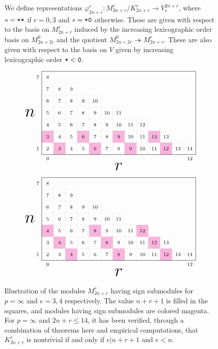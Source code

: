 \documentclass{amsart}
\begin{document}
\begin{figure}
\caption{We define representations $\varphi_{2n + r}^r:M_{2n + r}^r/K_{2n + r}^r \rightarrow V^{2n + r}_{s}$, where $s = \texttt{*}\texttt{*}$ if $r = 0,3$ and $s = \texttt{*}\texttt{0}$ otherwise.
These are given with respect to the basis on $M_{2n + r}^r$ induced by the increasing lexicographic order basis on $M_{2n + 2r}^0$ and the quotient $M_{2n + 2r}^0 \twoheadrightarrow M_{2n + r}^r$.
These are also given with respect to the basis on $V$ given by increasing lexicographic order $\texttt{*} < \texttt{0}$.
  }\label{Fib Data}
\end{figure}

\begin{figure}
  \[
    \ENRGrid{13/7}{2/1,5/1,8/1,11/1,1/2,4/2,7/2,10/2}
  \]\[
    \ENRGrid{13/7}{3/1,7/1,11/1,2/2,6/2,10/2,1/3,5/3,9/3}
  \]
  \caption{
    Illustration of the modules $M_{2n + r}^r$ having sign submodules for $p = \infty$ and $e = 3,4$ respectively.
    The value $n + r + 1$ is filled in the squares, and modules having sign submodules are colored magenta.
    For $p = \infty$ and $2n + r \leq 14$, it has been verified, through a combination of theorems here and empirical computations, that $K_{2n + r}^r$ is nontrivial if and only if $e | n+r+1$ and $e < n$.
  }\label{Empirical Kernel}
\end{figure}

\def\qqo{\alpha}
\def\tto{\beta}
\def\vtv{\gamma}
\def\fft{\delta}
\def\fto{\varepsilon}
\setcounter{MaxMatrixCols}{20}
\end{document}
